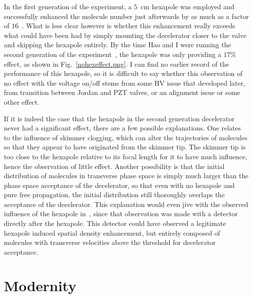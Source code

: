 In the first generation of the experiment, a $5$~cm hexapole was employed and successfully enhanced the molecule number just afterwards by as much as a factor of $16$~\citep[Fig.~6]{Bochinski2004}.
What is less clear however is whether this enhancement really exceeds what could have been had by simply mounting the decelerator closer to the valve and skipping the hexapole entirely.
By the time Hao and I were running the second generation of the experiment~\cite{Sawyer2007}, the hexapole was only providing a $17\%$ effect, as shown in Fig.~\ref{nohexeffect.png}.
I can find no earlier record of the performance of this hexapole, so it is difficult to say whether this observation of no effect with the voltage on/off stems from some HV issue that developed later, from transition between Jordan and PZT valves, or an alignment issue or some other effect.


If it is indeed the case that the hexapole in the second generation decelerator never had a significant effect, there are a few possible explanations.
One relates to the influence of skimmer clogging, which can alter the trajectories of molecules so that they appear to have originated from the skimmer tip.
The skimmer tip is too close to the hexapole relative to its focal length for it to have much influence, hence the observation of little effect.
Another possibility is that the initial distribution of molecules in transverse phase space is simply much larger than the phase space acceptance of the decelerator, so that even with no hexapole and pure free propagation, the initial distribution still thoroughly overlaps the acceptance of the decelerator.
This explanation would even jive with the observed influence of the hexapole in~\citep[Fig.~6]{Bochinski2004}, since that observation was made with a detector directly after the hexapole.
This detector could have observed a legitimate hexapole induced spatial density enhancement, but entirely composed of molecules with transverse velocities above the threshold for decelerator acceptance.


\section{Modernity}

